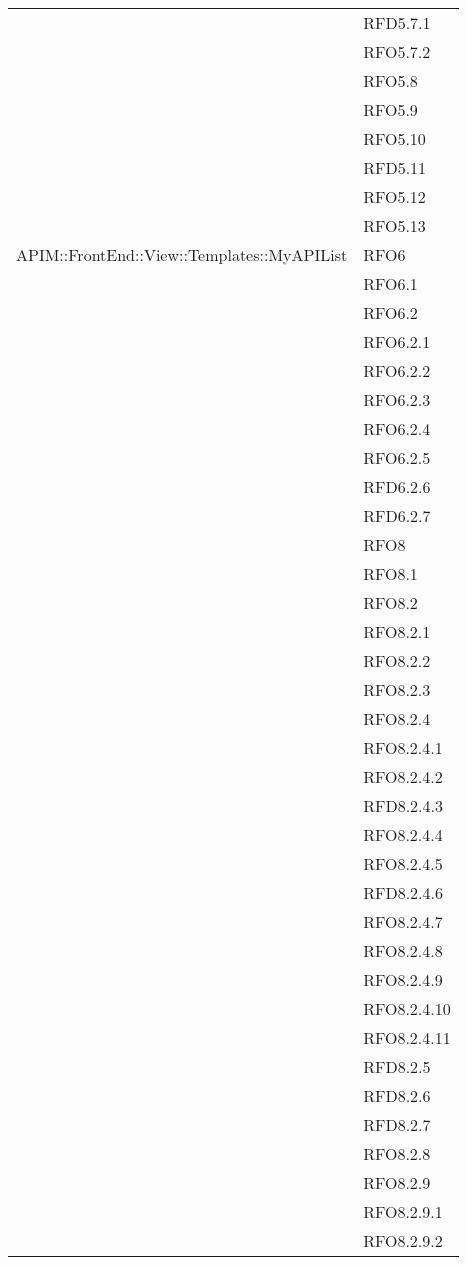 \begin{longtable}{ p{12cm} | p{4cm} }
& RFD5.7.1 \\
& RFO5.7.2 \\
& RFO5.8 \\
& RFO5.9 \\
& RFO5.10 \\
& RFD5.11 \\
& RFO5.12 \\
& RFO5.13 \\	
		    \hline	    
		    APIM::FrontEnd::View::Templates::MyAPIList
& RFO6 \\
& RFO6.1 \\
& RFO6.2 \\
& RFO6.2.1 \\
& RFO6.2.2 \\
& RFO6.2.3 \\
& RFO6.2.4 \\
& RFO6.2.5 \\
& RFD6.2.6 \\
& RFD6.2.7 \\		    
& RFO8 \\
& RFO8.1 \\
& RFO8.2 \\
& RFO8.2.1 \\
& RFO8.2.2 \\
& RFO8.2.3 \\
& RFO8.2.4 \\
& RFO8.2.4.1 \\
& RFO8.2.4.2 \\
& RFD8.2.4.3 \\
& RFO8.2.4.4 \\
& RFO8.2.4.5 \\
& RFD8.2.4.6 \\
& RFO8.2.4.7 \\
& RFO8.2.4.8 \\
& RFO8.2.4.9 \\
& RFO8.2.4.10 \\
& RFO8.2.4.11 \\
& RFD8.2.5 \\
& RFD8.2.6 \\
& RFD8.2.7 \\
& RFO8.2.8 \\
& RFO8.2.9 \\
& RFO8.2.9.1 \\
& RFO8.2.9.2 \\


\end{longtable}
